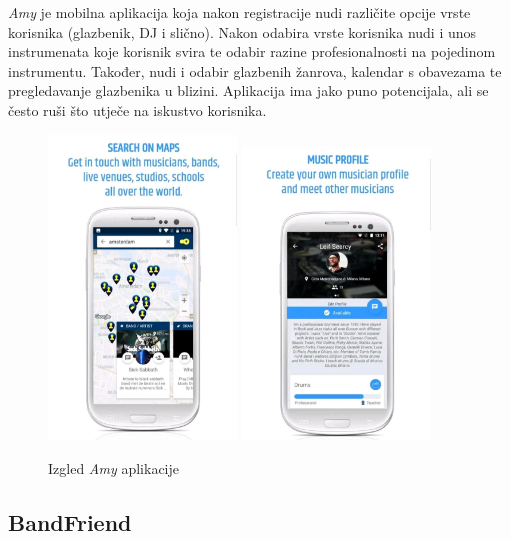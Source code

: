 		\textit{Amy} je mobilna aplikacija koja nakon registracije nudi različite opcije vrste korisnika (glazbenik, DJ i slično). Nakon odabira vrste korisnika nudi i unos instrumenata koje korisnik svira te odabir razine profesionalnosti na pojedinom instrumentu. Također, nudi i odabir glazbenih žanrova, kalendar s obavezama te pregledavanje glazbenika u blizini. Aplikacija ima jako puno potencijala, ali se često ruši što utječe na iskustvo korisnika. 
		\\
		
		\begin{figure}[H]
			\begin{center}
				\includegraphics[width=5cm]{slike/Amy.JPEG}
			\includegraphics[width=5cm]{slike/Amy2.JPEG}
			\end{center}
			\caption{Izgled \textit{Amy} aplikacije}
			\label{fig:promjene2}
		\end{figure}
		
		
		
	    \subsection{BandFriend}
		
